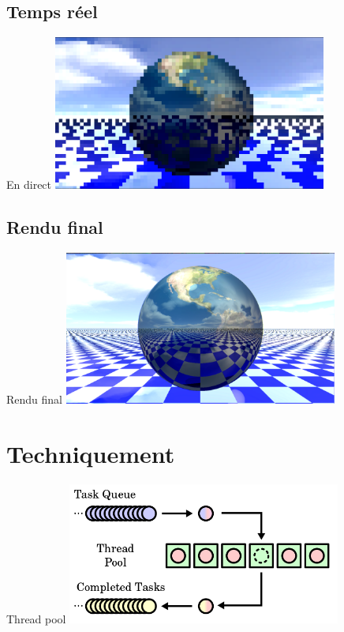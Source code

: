 \documentclass[10pt]{beamer}
\begin{document}
\subsection{Temps réel}

\begin{frame}[fragile]{En direct}
	\includegraphics[width=9cm]{./imgs/live.png}
\end{frame}

\subsection{Rendu final}

\begin{frame}[fragile]{Rendu final}
	\includegraphics[width=9cm]{./imgs/sphere.png}
\end{frame}

\section{Techniquement}

\begin{frame}[fragile]{Thread pool}
	\includegraphics[width=9cm]{./imgs/thread_pool.png}
\end{frame}
\end{document}
